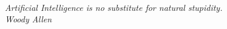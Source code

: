 \newpage
\ \\
\vspace{3cm}
\begin{flushright}


\textit{Artificial Intelligence is no substitute for natural stupidity.\\
\medskip
Woody Allen
}

\end{flushright}
\vfill

\clearpage{\pagestyle{empty}\cleardoublepage}
\setcounter{tocdepth}{1}
\tableofcontents